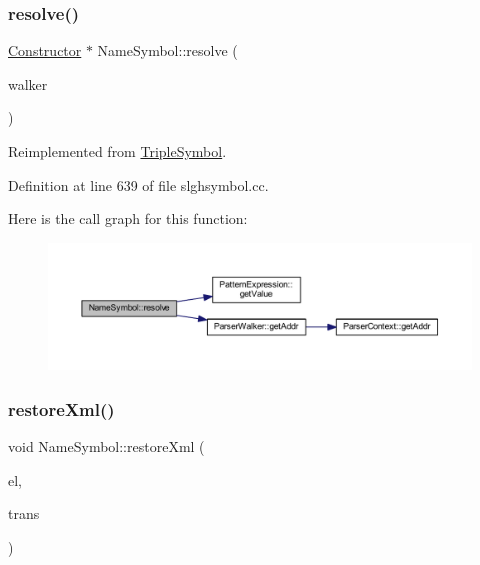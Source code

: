\subsubsection{\texorpdfstring{resolve()}{resolve()}}
{\footnotesize\ttfamily \mbox{\hyperlink{class_constructor}{Constructor}} $\ast$ Name\+Symbol\+::resolve (\begin{DoxyParamCaption}\item[{\mbox{\hyperlink{class_parser_walker}{Parser\+Walker}} \&}]{walker }\end{DoxyParamCaption})\hspace{0.3cm}{\ttfamily [virtual]}}



Reimplemented from \mbox{\hyperlink{class_triple_symbol_adc7ba86d4674c1b3cc8894cfcac33bf1}{Triple\+Symbol}}.



Definition at line 639 of file slghsymbol.\+cc.

Here is the call graph for this function\+:
\nopagebreak
\begin{figure}[H]
\begin{center}
\leavevmode
\includegraphics[width=350pt]{class_name_symbol_aad6d2abf3eaaeb6c92bc2a2b7f4c0a4c_cgraph}
\end{center}
\end{figure}
\mbox{\label{class_name_symbol_a3ff5b56a8a5cfd2e009cc5c9e8a49e97}} 
\subsubsection{\texorpdfstring{restoreXml()}{restoreXml()}}
{\footnotesize\ttfamily void Name\+Symbol\+::restore\+Xml (\begin{DoxyParamCaption}\item[{const \mbox{\hyperlink{class_element}{Element}} $\ast$}]{el,  }\item[{\mbox{\hyperlink{class_sleigh_base}{Sleigh\+Base}} $\ast$}]{trans }\end{DoxyParamCaption})\hspace{0.3cm}{\ttfamily [virtual]}}



